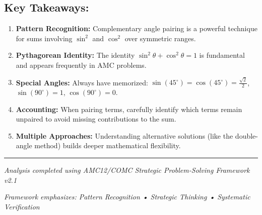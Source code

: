 \documentclass[12pt]{article}
\begin{document}
\subsection*{Key Takeaways:}

\begin{enumerate}
    \item \textbf{Pattern Recognition:} Complementary angle pairing is a powerful technique for sums involving $\sin^2$ and $\cos^2$ over symmetric ranges.
    
    \item \textbf{Pythagorean Identity:} The identity $\sin^2\theta + \cos^2\theta = 1$ is fundamental and appears frequently in AMC problems.
    
    \item \textbf{Special Angles:} Always have memorized: $\sin(45^{\circ}) = \cos(45^{\circ}) = \frac{\sqrt{2}}{2}$, $\sin(90^{\circ}) = 1$, $\cos(90^{\circ}) = 0$.
    
    \item \textbf{Accounting:} When pairing terms, carefully identify which terms remain unpaired to avoid missing contributions to the sum.
    
    \item \textbf{Multiple Approaches:} Understanding alternative solutions (like the double-angle method) builds deeper mathematical flexibility.
\end{enumerate}

\vspace{2em}

\hrule

\vspace{1em}

\begin{center}
\textit{Analysis completed using AMC12/COMC Strategic Problem-Solving Framework v2.1}

\textit{Framework emphasizes: Pattern Recognition • Strategic Thinking • Systematic Verification}
\end{center}
\end{document}
